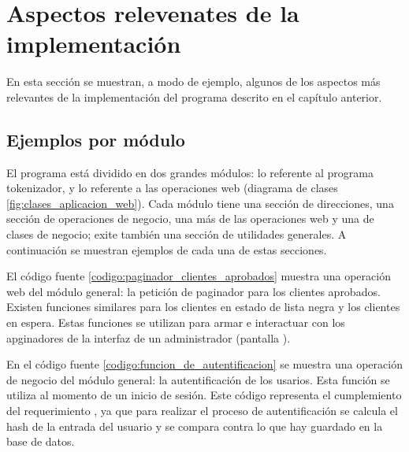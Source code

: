 %
%
%

\section{Aspectos relevenates de la implementación}

En esta sección se muestran, a modo de ejemplo, algunos de los aspectos más relevantes de la implementación del programa descrito en el capítulo anterior.

\subsection{Ejemplos por módulo}

El programa está dividido en dos grandes módulos: lo referente al programa tokenizador, y lo referente a las operaciones web (diagrama de clases \ref{fig:clases_aplicacion_web}). Cada módulo tiene una sección de direcciones, una sección de operaciones de negocio, una más de las operaciones web y una de clases de negocio; exite también una sección de utilidades generales. A continuación se muestran ejemplos de cada una de estas secciones.

El código fuente \ref{codigo:paginador_clientes_aprobados} muestra una operación web del módulo general: la petición de paginador para los clientes aprobados. Existen funciones similares para los clientes en estado de lista negra y los clientes en espera. Estas funciones se utilizan para armar e interactuar con los apginadores de la interfaz de un administrador (pantalla ).


En el código fuente \ref{codigo:funcion_de_autentificacion} se muestra una operación de negocio del módulo general: la autentificación de los usarios. Esta función se utiliza al momento de un inicio de sesión. Este código representa el cumplemiento del requerimiento , ya que para realizar el proceso de autentificación se calcula el hash de la entrada del usuario y se compara contra lo que hay guardado en la base de datos.


